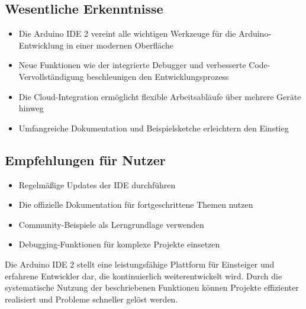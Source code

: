 \subsection*{Wesentliche Erkenntnisse}
\begin{itemize}
	\item Die Arduino IDE 2 vereint alle wichtigen Werkzeuge für die Arduino-Entwicklung in einer modernen Oberfläche
	\item Neue Funktionen wie der integrierte Debugger und verbesserte Code-Vervollständigung beschleunigen den Entwicklungsprozess
	\item Die Cloud-Integration ermöglicht flexible Arbeitsabläufe über mehrere Geräte hinweg
	\item Umfangreiche Dokumentation und Beispielsketche erleichtern den Einstieg
\end{itemize}

\subsection*{Empfehlungen für Nutzer}
\begin{itemize}
	\item Regelmäßige Updates der IDE durchführen
	\item Die offizielle Dokumentation für fortgeschrittene Themen nutzen
	\item Community-Beispiele als Lerngrundlage verwenden
	\item Debugging-Funktionen für komplexe Projekte einsetzen
\end{itemize}

Die Arduino IDE 2 stellt eine leistungsfähige Plattform für Einsteiger und erfahrene Entwickler dar, die kontinuierlich weiterentwickelt wird. Durch die systematische Nutzung der beschriebenen Funktionen können Projekte effizienter realisiert und Probleme schneller gelöst werden.








